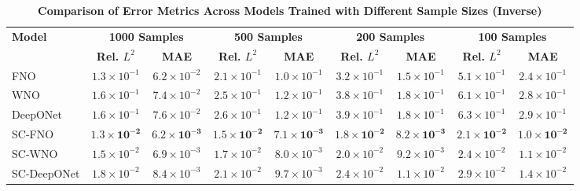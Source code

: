 



\begin{table}[ht!]
\centering
\caption{\scriptsize\textbf{Comparison of Error Metrics Across Models Trained with Different Sample Sizes (Inverse)}}
\label{tab:pde1_inverse_nostd} 
\scriptsize
\setlength{\tabcolsep}{3pt}
\begin{tabular}{lcccccccc}
\hline
\textbf{Model} & \multicolumn{2}{c}{\textbf{1000 Samples}} & \multicolumn{2}{c}{\textbf{500 Samples}} & \multicolumn{2}{c}{\textbf{200 Samples}} & \multicolumn{2}{c}{\textbf{100 Samples}} \\
 & \textbf{Rel. \(L^2\)} & \textbf{MAE} & \textbf{Rel. \(L^2\)} & \textbf{MAE} & \textbf{Rel. \(L^2\)} & \textbf{MAE} & \textbf{Rel. \(L^2\)} & \textbf{MAE} \\
\hline
FNO & \(1.3 \times 10^{-1}\) & \(6.2 \times 10^{-2}\) & \(2.1 \times 10^{-1}\) & \(1.0 \times 10^{-1}\) & \(3.2 \times 10^{-1}\) & \(1.5 \times 10^{-1}\) & \(5.1 \times 10^{-1}\) & \(2.4 \times 10^{-1}\) \\
WNO & \(1.6 \times 10^{-1}\) & \(7.4 \times 10^{-2}\) & \(2.5 \times 10^{-1}\) & \(1.2 \times 10^{-1}\) & \(3.8 \times 10^{-1}\) & \(1.8 \times 10^{-1}\) & \(6.1 \times 10^{-1}\) & \(2.8 \times 10^{-1}\) \\
DeepONet & \(1.6 \times 10^{-1}\) & \(7.6 \times 10^{-2}\) & \(2.6 \times 10^{-1}\) & \(1.2 \times 10^{-1}\) & \(3.9 \times 10^{-1}\) & \(1.8 \times 10^{-1}\) & \(6.3 \times 10^{-1}\) & \(2.9 \times 10^{-1}\) \\
SC-FNO & \(\mathbf{1.3 \times 10^{-2}}\) & \(\mathbf{6.2 \times 10^{-3}}\) & \(\mathbf{1.5 \times 10^{-2}}\) & \(\mathbf{7.1 \times 10^{-3}}\) & \(\mathbf{1.8 \times 10^{-2}}\) & \(\mathbf{8.2 \times 10^{-3}}\) & \(\mathbf{2.1 \times 10^{-2}}\) & \(\mathbf{1.0 \times 10^{-2}}\) \\
SC-WNO & \(1.5 \times 10^{-2}\) & \(6.9 \times 10^{-3}\) & \(1.7 \times 10^{-2}\) & \(8.0 \times 10^{-3}\) & \(2.0 \times 10^{-2}\) & \(9.2 \times 10^{-3}\) & \(2.4 \times 10^{-2}\) & \(1.1 \times 10^{-2}\) \\
SC-DeepONet & \(1.8 \times 10^{-2}\) & \(8.4 \times 10^{-3}\) & \(2.1 \times 10^{-2}\) & \(9.7 \times 10^{-3}\) & \(2.4 \times 10^{-2}\) & \(1.1 \times 10^{-2}\) & \(2.9 \times 10^{-2}\) & \(1.4 \times 10^{-2}\) \\
\hline
\end{tabular}
\end{table}






